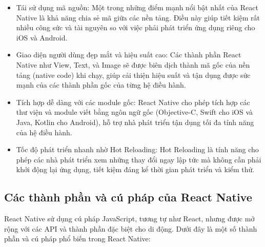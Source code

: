 \documentclass[a4paper]{report}
\begin{document}
\begin{itemize}
    \item Tái sử dụng mã nguồn: Một trong những điểm mạnh nổi bật nhất của React Native là khả năng chia sẻ mã giữa các nền tảng. Điều này giúp tiết kiệm rất nhiều công sức và tài nguyên so với việc phải phát triển ứng dụng riêng cho iOS và Android.
    
    \item Giao diện người dùng đẹp mắt và hiệu suất cao: Các thành phần React Native như View, Text, và Image sẽ được biên dịch thành mã gốc của nền tảng (native code) khi chạy, giúp cải thiện hiệu suất và tận dụng được sức mạnh của các thành phần gốc của từng hệ điều hành.
    
    \item Tích hợp dễ dàng với các module gốc: React Native cho phép tích hợp các thư viện và module viết bằng ngôn ngữ gốc (Objective-C, Swift cho iOS và Java, Kotlin cho Android), hỗ trợ nhà phát triển tận dụng tối đa tính năng của hệ điều hành.
    
    \item Tốc độ phát triển nhanh nhờ Hot Reloading: Hot Reloading là tính năng cho phép các nhà phát triển xem những thay đổi ngay lập tức mà không cần phải khởi động lại ứng dụng, tiết kiệm đáng kể thời gian phát triển và kiểm thử.
\end{itemize}

\subsection{Các thành phần và cú pháp của React Native}

React Native sử dụng cú pháp JavaScript, tương tự như React, nhưng được mở rộng với các API và thành phần đặc biệt cho di động. Dưới đây là một số thành phần và cú pháp phổ biến trong React Native:
\end{document}
